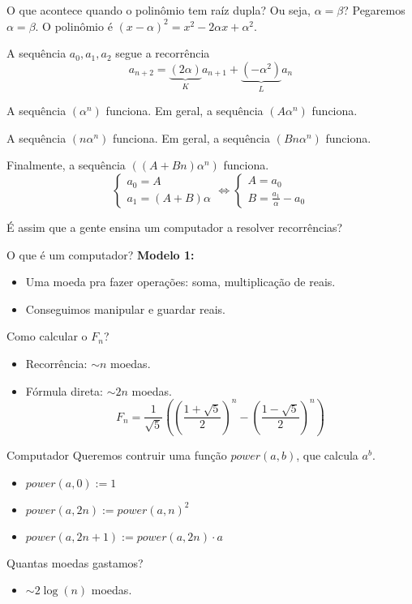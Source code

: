 \documentclass[aspectratio=169, handout]{beamer}
\begin{document}
\begin{frame}{O que acontece quando o polinômio tem raíz dupla? Ou seja, $\alpha = \beta$?}
	Pegaremos $\alpha = \beta$. O polinômio é $(x-\alpha)^2 = x^2 - 2\alpha x + \alpha^2$.

	A sequência $a_0, a_1, a_2$ segue a recorrência \[
		a_{n+2} = \underbrace{(2\alpha)}_K a_{n+1} + \underbrace{(-\alpha^2)}_L a_n
	\]

	A sequência $(\alpha^n)$ funciona. Em geral, a sequência $(A\alpha^n)$ funciona.
	
	A sequência $(n\alpha^n)$ funciona. Em geral, a sequência  $(Bn\alpha^n)$ funciona.

	Finalmente, a sequência  $((A + Bn)\alpha^n)$ funciona. \[
		\begin{cases}
			a_0 = A\\
			a_1 = (A + B)\alpha
		\end{cases}
		\iff 
		\begin{cases}
			A = a_0\\
			B = \frac{a_1}{\alpha} - a_0
		\end{cases}
	\]

\end{frame}

\begin{frame}{É assim que a gente ensina um computador a resolver recorrências?}

	O que é um computador? \textbf{Modelo 1:}
	\begin{itemize}
		\item Uma moeda pra fazer operações: soma, multiplicação de reais.
		\item Conseguimos manipular e guardar reais.
	\end{itemize}

	Como calcular o $F_{n}$?
	\begin{itemize}
		\item Recorrência: $\sim n$ moedas.
		\item Fórmula direta: $\sim 2n$ moedas.
			\[
				F_n = \frac{1}{\sqrt5}\left( \left(\frac{1 + \sqrt5}{2}\right)^n - \left(\frac{1 - \sqrt{5}}{2}\right)^n \right)
			\]
	\end{itemize}
\end{frame}

\begin{frame}{Computador}
	Queremos contruir uma função $power(a, b)$, que calcula $a^b$.
	\begin{itemize}
		\item $power(a, 0) := 1$
		\item $power(a, 2n) := power(a, n)^2$
		\item $power(a, 2n+1) := power(a, 2n) \cdot a$
	\end{itemize}

	Quantas moedas gastamos?
	\begin{itemize}
		\item $\sim 2\log(n)$ moedas.
	\end{itemize}	
\end{frame}
\end{document}
